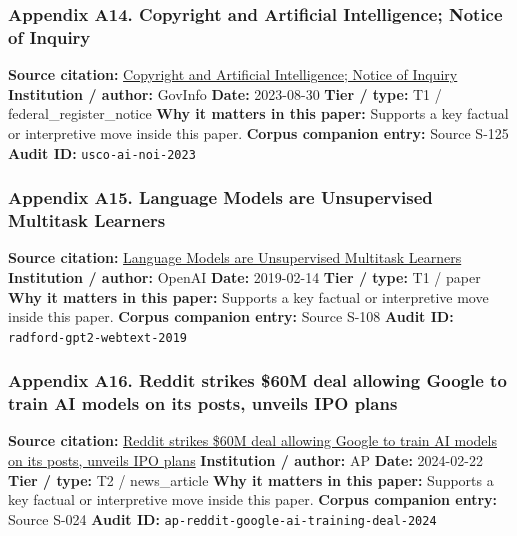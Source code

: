 \documentclass[
  american,
  11pt,
  letterpaper,
]{article}
\begin{document}
\subsubsection{Appendix A14. Copyright and Artificial Intelligence;
Notice of
Inquiry}\label{ch-10-appendix-a14-copyright-and-artificial-intelligence-notice-of-inquiry}

\textbf{Source citation:}
\href{https://www.govinfo.gov/content/pkg/FR-2023-08-30/pdf/2023-18624.pdf}{Copyright
and Artificial Intelligence; Notice of Inquiry} \textbf{Institution /
author:} GovInfo \textbf{Date:} 2023-08-30 \textbf{Tier / type:} T1 /
federal\_register\_notice \textbf{Why it matters in this paper:}
Supports a key factual or interpretive move inside this paper.
\textbf{Corpus companion entry:} Source S-125 \textbf{Audit ID:}
\texttt{usco-ai-noi-2023}

\subsubsection{Appendix A15. Language Models are Unsupervised Multitask
Learners}\label{ch-10-appendix-a15-language-models-are-unsupervised-multitask-learners}

\textbf{Source citation:}
\href{https://cdn.openai.com/better-language-models/language_models_are_unsupervised_multitask_learners.pdf}{Language
Models are Unsupervised Multitask Learners} \textbf{Institution /
author:} OpenAI \textbf{Date:} 2019-02-14 \textbf{Tier / type:} T1 /
paper \textbf{Why it matters in this paper:} Supports a key factual or
interpretive move inside this paper. \textbf{Corpus companion entry:}
Source S-108 \textbf{Audit ID:} \texttt{radford-gpt2-webtext-2019}

\subsubsection{Appendix A16. Reddit strikes \$60M deal allowing Google
to train AI models on its posts, unveils IPO
plans}\label{ch-10-appendix-a16-reddit-strikes-60m-deal-allowing-google-to-train-ai-models-on-its-posts-unveils-ipo-plans}

\textbf{Source citation:}
\href{https://apnews.com/article/a7f131c7cb4225307134ef21d3c6a708}{Reddit
strikes \$60M deal allowing Google to train AI models on its posts,
unveils IPO plans} \textbf{Institution / author:} AP \textbf{Date:}
2024-02-22 \textbf{Tier / type:} T2 / news\_article \textbf{Why it
matters in this paper:} Supports a key factual or interpretive move
inside this paper. \textbf{Corpus companion entry:} Source S-024
\textbf{Audit ID:} \texttt{ap-reddit-google-ai-training-deal-2024}
\end{document}
